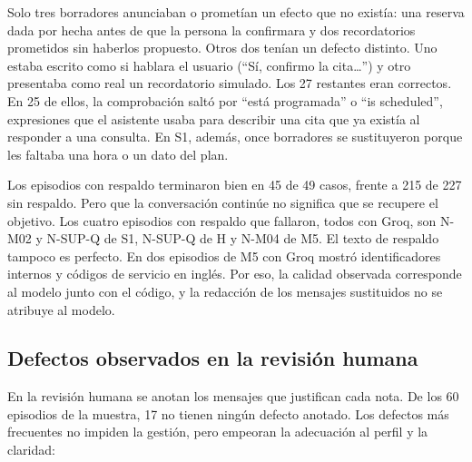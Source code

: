 \begin{table}[!htbp]
\centering
\small
\caption[Revisión de los borradores tomados por anuncios.]{Revisión manual de
los 32 borradores que la comprobación de la redacción tomó por el anuncio de un
efecto.}
\label{tab:borradores}

\end{table}

Solo tres borradores anunciaban o prometían un efecto que no existía: una
reserva dada por hecha antes de que la persona la confirmara y dos
recordatorios prometidos sin haberlos propuesto. Otros dos tenían un defecto
distinto. Uno estaba escrito como si hablara el usuario (\enquote{Sí, confirmo
la cita\ldots{}}) y otro presentaba como real un recordatorio simulado. Los 27
restantes eran correctos. En 25 de ellos, la comprobación saltó por
\enquote{está programada} o \enquote{is scheduled}, expresiones que el
asistente usaba para describir una cita que ya existía al responder a una
consulta. En S1, además, once borradores se sustituyeron porque les faltaba una
hora o un dato del plan.

Los episodios con respaldo terminaron bien en 45 de 49 casos, frente a 215 de
227 sin respaldo. Pero que la conversación continúe no significa que se
recupere el objetivo. Los cuatro episodios con respaldo que fallaron, todos con
Groq, son N-M02 y N-SUP-Q de S1, N-SUP-Q de H y N-M04 de M5. El texto de
respaldo tampoco es perfecto. En dos episodios de M5 con Groq mostró
identificadores internos y códigos de servicio en inglés. Por eso, la calidad
observada corresponde al modelo junto con el código, y la redacción de los
mensajes sustituidos no se atribuye al modelo.

\subsection{Defectos observados en la revisión humana}

En la revisión humana se anotan los mensajes que justifican cada nota. De los
60 episodios de la muestra, 17 no tienen ningún defecto anotado. Los defectos
más frecuentes no impiden la gestión, pero empeoran la adecuación al perfil y
la claridad:


